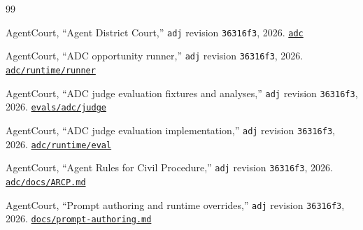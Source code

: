 \documentclass[11pt]{article}
\newcommand{\code}[1]{\texttt{#1}}
\begin{document}
\begingroup
\small
\setlength{\emergencystretch}{3em}
\begin{thebibliography}{99}
\raggedright

AgentCourt, ``Agent District Court,'' \code{adj} revision \code{36316f3}, 2026.  \href{https://github.com/agentcourt/adj/tree/36316f37ba577fdef69b8c6fe1247ce3509eab63/adc}{\code{adc}}

AgentCourt, ``ADC opportunity runner,'' \code{adj} revision \code{36316f3}, 2026.  \href{https://github.com/agentcourt/adj/tree/36316f37ba577fdef69b8c6fe1247ce3509eab63/adc/runtime/runner}{\code{adc/runtime/runner}}

AgentCourt, ``ADC judge evaluation fixtures and analyses,'' \code{adj} revision \code{36316f3}, 2026.  \href{https://github.com/agentcourt/adj/tree/36316f37ba577fdef69b8c6fe1247ce3509eab63/evals/adc/judge}{\code{evals/adc/judge}}

AgentCourt, ``ADC judge evaluation implementation,'' \code{adj} revision \code{36316f3}, 2026.  \href{https://github.com/agentcourt/adj/tree/36316f37ba577fdef69b8c6fe1247ce3509eab63/adc/runtime/eval}{\code{adc/runtime/eval}}

AgentCourt, ``Agent Rules for Civil Procedure,'' \code{adj} revision \code{36316f3}, 2026.  \href{https://github.com/agentcourt/adj/blob/36316f37ba577fdef69b8c6fe1247ce3509eab63/adc/docs/ARCP.md}{\code{adc/docs/ARCP.md}}

AgentCourt, ``Prompt authoring and runtime overrides,'' \code{adj} revision \code{36316f3}, 2026.  \href{https://github.com/agentcourt/adj/blob/36316f37ba577fdef69b8c6fe1247ce3509eab63/docs/prompt-authoring.md}{\code{docs/prompt-authoring.md}}

\end{thebibliography}
\endgroup
\end{document}
